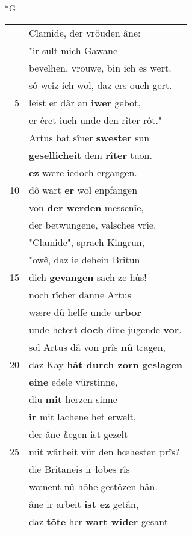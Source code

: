 \documentclass[8pt,a4paper,notitlepage]{article}
\begin{document}
\begin{table}[ht]
\begin{minipage}[t]{0.5\linewidth}
\small
\begin{center}*G
\end{center}
\begin{tabular}{rl}
 & Clamide, der vröuden âne:\\ 
 & "ir sult mich Gawane\\ 
 & bevelhen, vrouwe, bin ich es wert.\\ 
 & sô weiz ich wol, daz ers ouch gert.\\ 
5 & leist er dâr an \textbf{iwer} gebot,\\ 
 & er êret iuch unde den rîter rôt."\\ 
 & Artus bat sîner \textbf{swester} sun\\ 
 & \textbf{gesellicheit} dem \textbf{rîter} tuon.\\ 
 & \textbf{ez} wære iedoch ergangen.\\ 
10 & dô wart \textbf{er} wol enpfangen\\ 
 & von \textbf{der werden} messenîe,\\ 
 & der betwungene, valsches vrîe.\\ 
 & "Clamide", sprach Kingrun,\\ 
 & "owê, daz ie dehein Britun\\ 
15 & dich \textbf{gevangen} sach ze hûs!\\ 
 & noch rîcher danne Artus\\ 
 & wære dû helfe unde \textbf{urbor}\\ 
 & unde hetest \textbf{doch} dîne jugende \textbf{vor}.\\ 
 & sol Artus dâ von prîs \textbf{nû} tragen,\\ 
20 & daz Kay \textbf{hât durch zorn} \textbf{geslagen}\\ 
 & \textbf{eine} edele vürstinne,\\ 
 & diu \textbf{mit} herzen sinne\\ 
 & \textbf{ir} mit lachene het erwelt,\\ 
 & der âne \textit{l}iegen ist gezelt\\ 
25 & mit wârheit vür den hœhesten prîs?\\ 
 & die Britaneis ir lobes rîs\\ 
 & wænent nû hôhe gestôzen hân.\\ 
 & âne ir arbeit \textbf{ist ez} getân,\\ 
 & daz \textbf{tôte} her \textbf{wart wider} gesant\\ 

\end{tabular}
\end{minipage}
\end{table}
\end{document}
